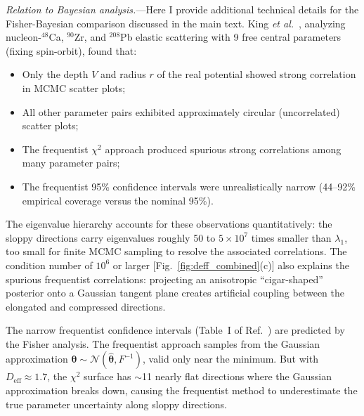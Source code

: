 \documentclass[aps,prl,reprint,superscriptaddress,showpacs,floatfix]{revtex4-2}
\begin{document}
\textit{Relation to Bayesian analysis.}---Here I provide additional technical details for the Fisher-Bayesian comparison discussed in the main text. King \textit{et al.}~\cite{King2019PRL}, analyzing nucleon-$^{48}$Ca, $^{90}$Zr, and $^{208}$Pb elastic scattering with 9 free central parameters (fixing spin-orbit), found that:
\begin{itemize}
\item Only the depth $V$ and radius $r$ of the real potential showed strong correlation in MCMC scatter plots;
\item All other parameter pairs exhibited approximately circular (uncorrelated) scatter plots;
\item The frequentist $\chi^2$ approach produced spurious strong correlations among many parameter pairs;
\item The frequentist 95\% confidence intervals were unrealistically narrow (44--92\% empirical coverage versus the nominal 95\%).
\end{itemize}

The eigenvalue hierarchy accounts for these observations quantitatively: the sloppy directions carry eigenvalues roughly 50 to $5\times10^7$ times smaller than $\lambda_1$, too small for finite MCMC sampling to resolve the associated correlations. The condition number of $10^6$ or larger [Fig.~\ref{fig:deff_combined}(c)] also explains the spurious frequentist correlations: projecting an anisotropic ``cigar-shaped'' posterior onto a Gaussian tangent plane creates artificial coupling between the elongated and compressed directions.

The narrow frequentist confidence intervals (Table~I of Ref.~\cite{King2019PRL}) are predicted by the Fisher analysis. The frequentist approach samples from the Gaussian approximation $\boldsymbol{\theta} \sim \mathcal{N}(\hat{\boldsymbol{\theta}}, F^{-1})$, valid only near the minimum. But with $D_\mathrm{eff} \approx 1.7$, the $\chi^2$ surface has $\sim$11 nearly flat directions where the Gaussian approximation breaks down, causing the frequentist method to underestimate the true parameter uncertainty along sloppy directions.
\end{document}
